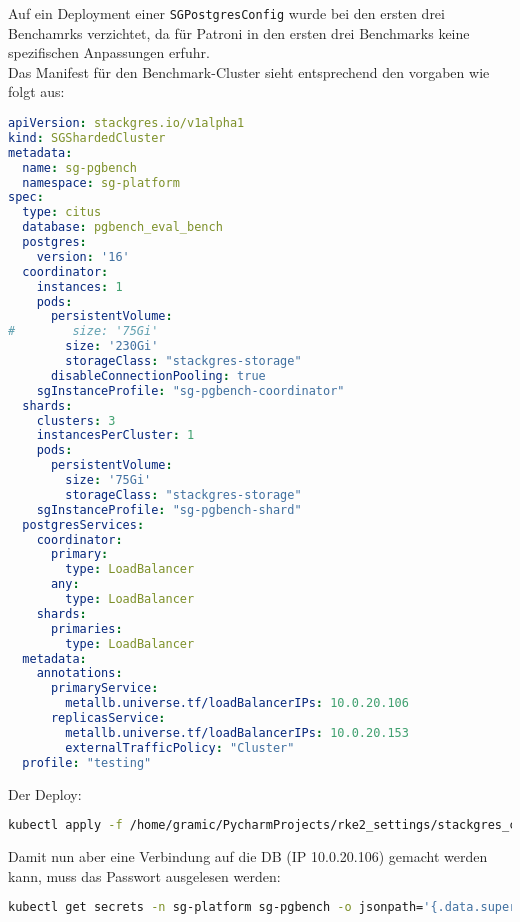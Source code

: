 Auf ein Deployment einer \texttt{SGPostgresConfig} wurde bei den ersten drei Benchamrks verzichtet, da für Patroni in den ersten drei Benchmarks keine spezifischen Anpassungen erfuhr.\\
Das Manifest für den Benchmark-Cluster sieht entsprechend den vorgaben wie folgt aus:
\lstset{style=gra_codestyle}
\begin{lstlisting}[language=yaml, caption=StackGres-Citus - Benchmarking - SGShardedCluster,captionpos=b,label={lst:SGShardedCluster_pgbench.yaml},breaklines=true]
apiVersion: stackgres.io/v1alpha1
kind: SGShardedCluster
metadata:
  name: sg-pgbench
  namespace: sg-platform
spec:
  type: citus
  database: pgbench_eval_bench
  postgres:
    version: '16'
  coordinator:
    instances: 1
    pods:
      persistentVolume:
#        size: '75Gi'
        size: '230Gi'
        storageClass: "stackgres-storage"
      disableConnectionPooling: true
    sgInstanceProfile: "sg-pgbench-coordinator"
  shards:
    clusters: 3
    instancesPerCluster: 1
    pods:
      persistentVolume:
        size: '75Gi'
        storageClass: "stackgres-storage"
    sgInstanceProfile: "sg-pgbench-shard"
  postgresServices:
    coordinator:
      primary:
        type: LoadBalancer
      any:
        type: LoadBalancer
    shards:
      primaries:
        type: LoadBalancer
  metadata:
    annotations:
      primaryService:
        metallb.universe.tf/loadBalancerIPs: 10.0.20.106
      replicasService:
        metallb.universe.tf/loadBalancerIPs: 10.0.20.153
        externalTrafficPolicy: "Cluster"
  profile: "testing"
\end{lstlisting}
Der Deploy:
\lstset{style=gra_codestyle}
\begin{lstlisting}[language=bash, caption=StackGres-Citus - Benchmark - Cluster Deploy,captionpos=b,label={lst:stackgres_citus-benchmnarking-deploy-cluster},breaklines=true]
kubectl apply -f /home/gramic/PycharmProjects/rke2_settings/stackgres_citus/stackgres_citus/SGShardedCluster_pgbench.yaml
\end{lstlisting}

Damit nun aber eine Verbindung auf die DB (IP 10.0.20.106) gemacht werden kann, muss das Passwort ausgelesen werden:
\lstset{style=gra_codestyle}
\begin{lstlisting}[language=bash, caption=StackGres-Citus - Benchmark DB Passwort,captionpos=b,label={lst:stackgres_citus-get-benchmark-cluster-passwd},breaklines=true]
kubectl get secrets -n sg-platform sg-pgbench -o jsonpath='{.data.superuser-password}' | base64 -d
\end{lstlisting}

